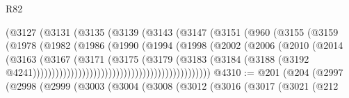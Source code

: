 \begin{lexlean}{R82}
\begin{coremodule}
                                        (@3127
                                          (@3131
                                            (@3135
                                              (@3139
                                                (@3143
                                                  (@3147
                                                    (@3151
                                                      (@960
                                                        (@3155
                                                          (@3159
                                                            (@1978
                                                              (@1982
                                                                (@1986
                                                                  (@1990
                                                                    (@1994
                                                                      (@1998
                                                                        (@2002
                                                                          (@2006
                                                                            (@2010
                                                                              (@2014
                                                                                (@3163
                                                                                  (@3167
                                                                                    (@3171
                                                                                      (@3175
                                                                                        (@3179
                                                                                          (@3183
                                                                                            (@3184
                                                                                              (@3188
                                                                                                (@3192
                                                                                                  @4241)))))))))))))))))))))))))))))))))))))))))))))))
@4310 := @201
    (@204
      (@2997
        (@2998
          (@2999
            (@3003
              (@3004
                (@3008
                  (@3012
                    (@3016
                      (@3017
                        (@3021
                          (@212

\end{coremodule}
\end{lexlean}
